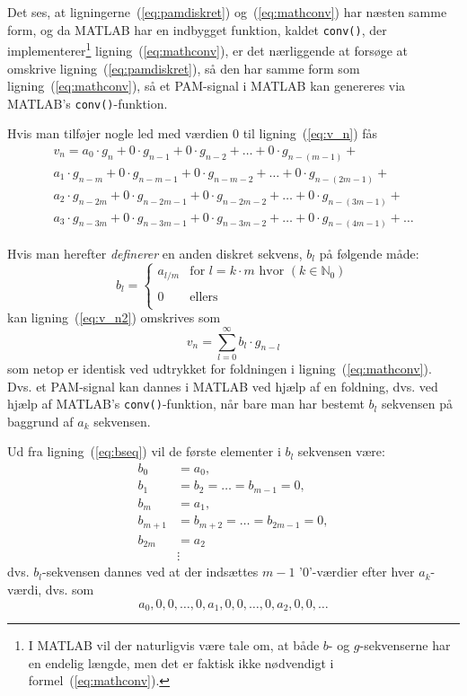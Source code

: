 \documentclass[dvips,11pt,a4paper]{article}
\begin{document}
\noindent{}Det ses, at ligningerne~(\ref{eq:pamdiskret}) og~(\ref{eq:mathconv}) har næsten samme form, og da MATLAB har en indbygget funktion, kaldet \texttt{conv()}, der implementerer\footnote{I MATLAB vil der naturligvis være tale om, at både $b$- og $g$-sekvenserne har en endelig længde, men det er faktisk ikke nødvendigt i formel~(\ref{eq:mathconv}).}  ligning~(\ref{eq:mathconv}), er det nærliggende at forsøge at omskrive ligning~(\ref{eq:pamdiskret}), så den har samme form som ligning~(\ref{eq:mathconv}), så et PAM-signal i MATLAB kan genereres via MATLAB's \texttt{conv()}-funktion.

Hvis man tilføjer nogle led med værdien 0 til ligning~(\ref{eq:v_n}) fås
\begin{multline}
v_{n} = a_{0}\cdot{}g_{n} + 0\cdot{}g_{n-1} + 0\cdot{}g_{n-2} + \ldots + 0\cdot{}g_{n-(m-1)} +  \\
a_{1}\cdot{}g_{n-m} + 0\cdot{}g_{n-m-1} + 0\cdot{}g_{n-m-2} + \ldots + 0\cdot{}g_{n-(2m-1)} +  \\
a_{2}\cdot{}g_{n-2m} + 0\cdot{}g_{n-2m-1} + 0\cdot{}g_{n-2m-2} + \ldots + 0\cdot{}g_{n-(3m-1)} +  \\
a_{3}\cdot{}g_{n-3m} + 0\cdot{}g_{n-3m-1} + 0\cdot{}g_{n-3m-2} + \ldots + 0\cdot{}g_{n-(4m-1)} + \ldots{}
\label{eq:v_n2}
\end{multline}

\noindent{}Hvis man herefter \emph{definerer} en anden diskret sekvens, $b_l$ på følgende måde:
\begin{equation}
b_{l}=\left\lbrace
\begin{array}{ll}
a_{l/m} & \textrm{for }l=k\cdot{}m\textrm{ hvor }(k\in{}\mathbb{N}_{0}) \\
 & \\
0 & \textrm{ellers}\\
\end{array}
\right.
\label{eq:bseq}
\end{equation}
kan ligning~(\ref{eq:v_n2}) omskrives som
\begin{equation}
v_n=\sum_{l=0}^{\infty} b_l\cdot{}g_{n-l}
\label{eq:v_n3}
\end{equation}
som netop er identisk ved udtrykket for foldningen i ligning~(\ref{eq:mathconv}). Dvs. et PAM-signal kan dannes i MATLAB ved hjælp af en foldning, dvs. ved hjælp af MATLAB's \texttt{conv()}-funktion, når bare man har bestemt $b_l$ sekvensen på baggrund af $a_k$ sekvensen.

Ud fra ligning~(\ref{eq:bseq}) vil de første elementer i $b_l$ sekvensen være:
\begin{align*}
b_{0}&=a_{0},\\
b_{1}&=b_{2}=\ldots{}=b_{m-1}=0,\\
b_{m}&=a_{1},\\
b_{m+1}&=b_{m+2}=\ldots{}=b_{2m-1}=0,\\
b_{2m}&=a_{2}\\
&\vdots
\end{align*}
dvs. $b_l$-sekvensen dannes ved at der indsættes $m-1$ '0'-værdier efter hver $a_k$-værdi, dvs. som
\[
a_0,0,0,\ldots,0,a_1,0,0,\ldots,0,a_2,0,0,\ldots
\]
\end{document}
